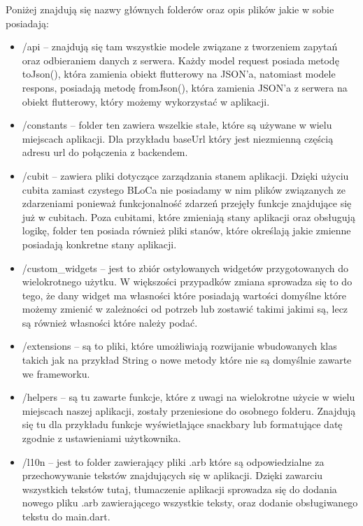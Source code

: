 \documentclass[a4paper,twoside,12pt]{book}
\begin{document}
Poniżej znajdują się nazwy głównych folderów oraz opis plików jakie w sobie posiadają:
\begin{itemize}
    \item /api -- znajdują się tam wszystkie modele związane z tworzeniem zapytań oraz odbieraniem danych z serwera. Każdy model request posiada metodę toJson(), która zamienia obiekt flutterowy na JSON'a, natomiast modele respons, posiadają metodę fromJson(), która zamienia JSON'a z serwera na obiekt flutterowy, który możemy wykorzystać w aplikacji.

    \item /constants -- folder ten zawiera wszelkie stałe, które są używane w wielu miejscach aplikacji. Dla przykładu baseUrl który jest niezmienną częścią adresu url do połączenia z backendem.

    \item /cubit -- zawiera pliki dotyczące zarządzania stanem aplikacji. Dzięki użyciu cubita zamiast czystego BLoCa nie posiadamy w nim plików związanych ze zdarzeniami ponieważ funkcjonalność zdarzeń przejęły funkcje znajdujące się już w cubitach. Poza cubitami, które zmieniają stany aplikacji oraz obsługują logikę, folder ten posiada również pliki stanów, które określają jakie zmienne posiadają konkretne stany aplikacji.

    \item /custom\_widgets -- jest to zbiór ostylowanych widgetów przygotowanych do wielokrotnego użytku. W większości przypadków zmiana sprowadza się to do tego, że dany widget ma własności które posiadają wartości domyślne które możemy zmienić w zależności od potrzeb lub zostawić takimi jakimi są, lecz są również własności które należy podać.

    \item /extensions -- są to pliki, które umożliwiają rozwijanie wbudowanych klas takich jak na przykład String o nowe metody które nie są domyślnie zawarte we frameworku.

    \item /helpers -- są tu zawarte funkcje, które z uwagi na wielokrotne użycie w wielu miejscach naszej aplikacji, zostały przeniesione do osobnego folderu. Znajdują się tu dla przykładu funkcje wyświetlające snackbary lub formatujące datę zgodnie z ustawieniami użytkownika. 

    \item /l10n -- jest to folder zawierający pliki .arb które są odpowiedzialne za przechowywanie tekstów znajdujących się w aplikacji. Dzięki zawarciu wszystkich tekstów tutaj, tłumaczenie aplikacji sprowadza się do dodania nowego pliku .arb zawierającego wszystkie teksty, oraz dodanie obsługiwanego tekstu do main.dart. 


\end{itemize}
\end{document}
